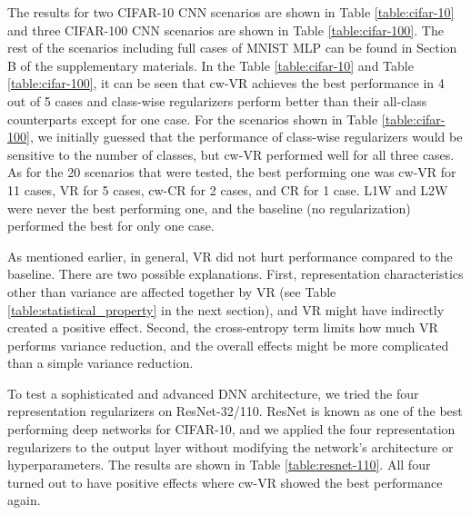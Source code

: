 The results for two CIFAR-10 CNN scenarios are shown in Table \ref{table:cifar-10} and three CIFAR-100 CNN scenarios are shown in Table \ref{table:cifar-100}. The rest of the scenarios including full cases of MNIST MLP can be found in Section B of the supplementary materials. In the Table \ref{table:cifar-10} and Table \ref{table:cifar-100}, it can be seen that cw-VR achieves the best performance in 4 out of 5 cases and class-wise regularizers perform better than their all-class counterparts except for one case. For the scenarios shown in Table \ref{table:cifar-100}, we initially guessed that the performance of class-wise regularizers would be sensitive to the number of classes, but cw-VR performed well for all three cases. As for the 20 scenarios that were tested, the best performing one was cw-VR for 11 cases, VR for 5 cases, cw-CR for 2 cases, and CR for 1 case. L1W and L2W were never the best performing one, and the baseline (no regularization) performed the best for only one case. 

As mentioned earlier, in general, VR did not hurt performance compared to the baseline. There are two possible explanations. First, representation characteristics other than variance are affected together by VR (see Table \ref{table:statistical_property} in the next section), and VR might have indirectly created a positive effect. Second, the cross-entropy term limits how much VR performs variance reduction, and the overall effects might be more complicated than a simple variance reduction.


To test a sophisticated and advanced DNN architecture, we tried the four representation regularizers on ResNet-32/110. ResNet is known as one of the best performing deep networks for CIFAR-10, and we applied the four representation regularizers to the output layer without modifying the network's architecture or hyperparameters. The results are shown in Table \ref{table:resnet-110}. All four turned out to have positive effects where cw-VR showed the best performance again. 

